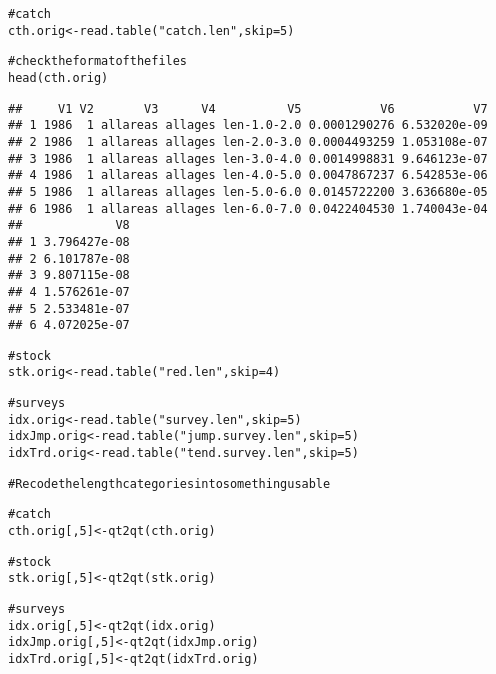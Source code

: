 \documentclass[a4paper,english,10pt]{article}\usepackage[]{graphicx}\usepackage[]{color}
\makeatletter
\newcommand{\hlnum}[1]{\textcolor[rgb]{0.2,0.2,0.2}{#1}}%
\newcommand{\hlstr}[1]{\textcolor[rgb]{0.2,0.2,0.2}{#1}}%
\newcommand{\hlcom}[1]{\textcolor[rgb]{0.2,0.267,0.4}{#1}}%
\newcommand{\hlstd}[1]{\textcolor[rgb]{0,0,0}{#1}}%
\newcommand{\hlkwb}[1]{\textcolor[rgb]{0.361,0.506,0.596}{#1}}%
\newcommand{\hlkwc}[1]{\textcolor[rgb]{0.361,0.506,0.596}{#1}}%
\newcommand{\hlkwd}[1]{\textcolor[rgb]{0.361,0.506,0.596}{#1}}%
\newenvironment{kframe}{%
 \def\at@end@of@kframe{}%
 \ifinner\ifhmode%
  \def\at@end@of@kframe{\end{minipage}}%
  \begin{minipage}{\columnwidth}%
 \fi\fi%
 \def\FrameCommand##1{\hskip\@totalleftmargin \hskip-\fboxsep
 \colorbox{shadecolor}{##1}\hskip-\fboxsep
     \hskip-\linewidth \hskip-\@totalleftmargin \hskip\columnwidth}%
 \MakeFramed {\advance\hsize-\width
   \@totalleftmargin\z@ \linewidth\hsize
   \@setminipage}}%
 {\par\unskip\endMakeFramed%
 \at@end@of@kframe}
\newenvironment{knitrout}{}{} %
\makeatother
\begin{document}
\begin{knitrout}
\color{fgcolor}\begin{kframe}
\begin{alltt}
\hlcom{# catch}
\hlstd{cth.orig} \hlkwb{<-} \hlkwd{read.table}\hlstd{(}\hlstr{"catch.len"}\hlstd{,} \hlkwc{skip}\hlstd{=}\hlnum{5}\hlstd{)}

\hlcom{# check the format of the files}
\hlkwd{head}\hlstd{(cth.orig)}
\end{alltt}
\begin{verbatim}
##     V1 V2       V3      V4          V5           V6           V7
## 1 1986  1 allareas allages len-1.0-2.0 0.0001290276 6.532020e-09
## 2 1986  1 allareas allages len-2.0-3.0 0.0004493259 1.053108e-07
## 3 1986  1 allareas allages len-3.0-4.0 0.0014998831 9.646123e-07
## 4 1986  1 allareas allages len-4.0-5.0 0.0047867237 6.542853e-06
## 5 1986  1 allareas allages len-5.0-6.0 0.0145722200 3.636680e-05
## 6 1986  1 allareas allages len-6.0-7.0 0.0422404530 1.740043e-04
##             V8
## 1 3.796427e-08
## 2 6.101787e-08
## 3 9.807115e-08
## 4 1.576261e-07
## 5 2.533481e-07
## 6 4.072025e-07
\end{verbatim}
\begin{alltt}
\hlcom{# stock}
\hlstd{stk.orig} \hlkwb{<-} \hlkwd{read.table}\hlstd{(}\hlstr{"red.len"}\hlstd{,} \hlkwc{skip}\hlstd{=}\hlnum{4}\hlstd{)}

\hlcom{# surveys}
\hlstd{idx.orig} \hlkwb{<-} \hlkwd{read.table}\hlstd{(}\hlstr{"survey.len"}\hlstd{,} \hlkwc{skip}\hlstd{=}\hlnum{5}\hlstd{)}
\hlstd{idxJmp.orig} \hlkwb{<-} \hlkwd{read.table}\hlstd{(}\hlstr{"jump.survey.len"}\hlstd{,} \hlkwc{skip}\hlstd{=}\hlnum{5}\hlstd{)}
\hlstd{idxTrd.orig} \hlkwb{<-} \hlkwd{read.table}\hlstd{(}\hlstr{"tend.survey.len"}\hlstd{,} \hlkwc{skip}\hlstd{=}\hlnum{5}\hlstd{)}

\hlcom{# Recode the length categories into something usable}

\hlcom{# catch}
\hlstd{cth.orig[,}\hlnum{5}\hlstd{]} \hlkwb{<-} \hlkwd{qt2qt}\hlstd{(cth.orig)}

\hlcom{# stock}
\hlstd{stk.orig[,}\hlnum{5}\hlstd{]} \hlkwb{<-} \hlkwd{qt2qt}\hlstd{(stk.orig)}

\hlcom{# surveys}
\hlstd{idx.orig[,}\hlnum{5}\hlstd{]} \hlkwb{<-} \hlkwd{qt2qt}\hlstd{(idx.orig)}
\hlstd{idxJmp.orig[,}\hlnum{5}\hlstd{]} \hlkwb{<-} \hlkwd{qt2qt}\hlstd{(idxJmp.orig)}
\hlstd{idxTrd.orig[,}\hlnum{5}\hlstd{]} \hlkwb{<-} \hlkwd{qt2qt}\hlstd{(idxTrd.orig)}
\end{alltt}
\end{kframe}
\end{knitrout}
\end{document}
